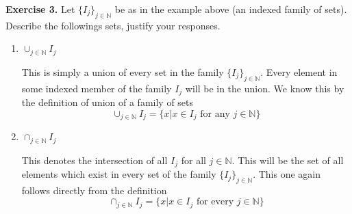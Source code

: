 \documentclass[11pt, leqno]{article}
\begin{document}
{\bfseries Exercise 3.} Let $\{I_j\}_{j \in \mathbb{N}}$ be as in the example above (an indexed family of sets). Describe the followings sets, justify your responses. 
\begin{enumerate}[label=(\alph*)]
	\item $\cup_{j \in \mathbb{N}} I_j$
	
	This is simply a union of every set in the family $\{I_j\}_{j \in \mathbb{N}}$. Every element in some indexed member of the family $I_j$ will be in the union. We know this by the definition of union of a family of sets
	\[
		\cup_{j \in \mathbb{N}} I_j = \{x | x \in I_j \text{ for any } j \in \mathbb{N}\}
	\]
	
	\item $\cap_{j \in \mathbb{N}} I_j$
	
	This denotes the intersection of all $I_j$ for all $j \in \mathbb{N}$. This will be the set of all elements which exist in every set of the family $\{I_j\}_{j \in \mathbb{N}}$. This one again follows directly from the definition
	\[
		\cap_{j \in \mathbb{N}} I_j = \{x | x \in I_j \text{ for every } j \in \mathbb{N}\}
	\]
	
\end{enumerate}
\end{document}
